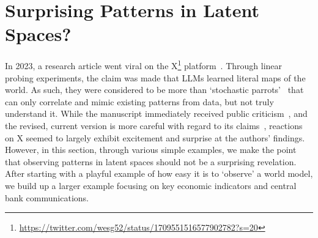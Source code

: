 \documentclass{article}
\theoremstyle{plain}
\theoremstyle{definition}
\theoremstyle{remark}
\begin{document}



\section{Surprising Patterns in Latent Spaces?}\label{patterns-in-latent-spaces-and-how-to-find-them}

In 2023, a research article went viral on the X\footnote{\url{https://twitter.com/wesg52/status/1709551516577902782?s=20}}
platform~\cite{gurnee2023languagev1}. Through linear probing experiments, the claim was made that LLMs learned literal maps of the world. As such, they were considered to be more than `stochastic parrots'~\cite{bender2021dangers} that can only correlate and mimic existing patterns from data, but not truly understand it. While the manuscript immediately received public criticism~\cite{marcus2023muddles}, and the revised, current version is more careful with regard to its claims~\cite{gurnee2023languagev2}, reactions on X seemed to largely exhibit excitement and surprise at the authors' findings. However, in this section, through various simple examples, we make the point that observing patterns in latent spaces should not be a surprising revelation. After starting with a playful example of how easy it is to `observe' a world model, we build up a larger example focusing on key economic indicators and central bank communications.
\end{document}
